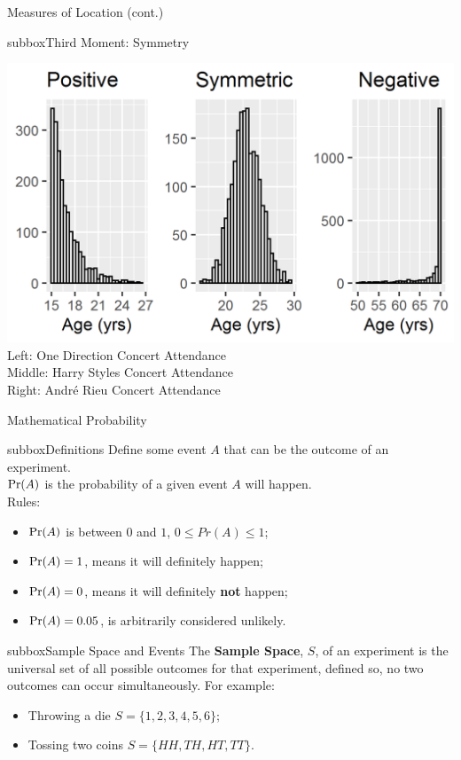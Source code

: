 \documentclass[10pt,a4paper]{article}
\def\Pr{\mathop{\rm Pr}}
\begin{document}
\begin{multicols}{3}
\begin{textbox}{Measures of Location (cont.)}
\begin{subbox}{subbox}{Third Moment: Symmetry}
\begin{center}
\tiny
    \includegraphics[width=\textwidth]{Figures/Measures_of_Location/skew.png}
Left: One Direction Concert Attendance \\ Middle: Harry Styles Concert Attendance \\ Right: André Rieu Concert Attendance
\end{center}
\end{subbox}
\end{textbox}
\begin{textbox}{Mathematical Probability }
\begin{subbox}{subbox}{Definitions}
\tiny
Define some event $A$ that can be the outcome of an experiment.\\
$\Pr(A)$ is the probability of a given event $A$ will happen.\\
Rules:
\begin{itemize}
    \item $\Pr(A)$ is between $0$ and $1$, $0\leq Pr(A) \leq 1$;
    \item $\Pr(A)=1$, means it will definitely happen;
    \item $\Pr(A)=0$, means it will definitely \textbf{not} happen;
    \item $\Pr(A)=0.05$, is arbitrarily considered unlikely.
\end{itemize}
\end{subbox}

\begin{subbox}{subbox}{Sample Space and Events}
\tiny
The \textbf{Sample Space}, $S$, of an experiment is the universal set of all possible outcomes for that experiment, defined so, no two outcomes can occur simultaneously. For example:
\begin{itemize}
    \item Throwing a die $S=\{1,2,3,4,5,6\};$
    \item Tossing two coins $S=\{HH,TH,HT,TT\}.$
\end{itemize}


\end{subbox}
\end{textbox}
\end{multicols}
\end{document}
